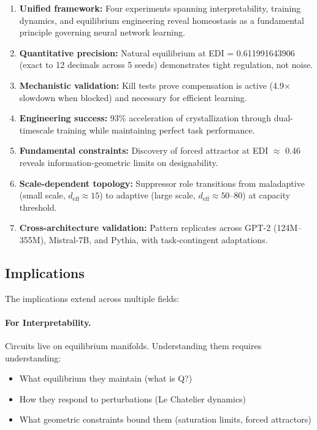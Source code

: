 \begin{enumerate}
\item \textbf{Unified framework:} Four experiments spanning interpretability, training dynamics, and equilibrium engineering reveal homeostasis as a fundamental principle governing neural network learning.

\item \textbf{Quantitative precision:} Natural equilibrium at EDI = 0.611991643906 (exact to 12 decimals across 5 seeds) demonstrates tight regulation, not noise.

\item \textbf{Mechanistic validation:} Kill tests prove compensation is active (4.9× slowdown when blocked) and necessary for efficient learning.

\item \textbf{Engineering success:} 93\% acceleration of crystallization through dual-timescale training while maintaining perfect task performance.

\item \textbf{Fundamental constraints:} Discovery of forced attractor at EDI $\approx$ 0.46 reveals information-geometric limits on designability.

\item \textbf{Scale-dependent topology:} Suppressor role transitions from maladaptive (small scale, $d_{\text{eff}} \approx 15$) to adaptive (large scale, $d_{\text{eff}} \approx 50$--80) at capacity threshold.

\item \textbf{Cross-architecture validation:} Pattern replicates across GPT-2 (124M--355M), Mistral-7B, and Pythia, with task-contingent adaptations.
\end{enumerate}

\subsection{Implications}

The implications extend across multiple fields:

\paragraph{For Interpretability.}
Circuits live on equilibrium manifolds. Understanding them requires understanding:
\begin{itemize}
\item What equilibrium they maintain (what is Q?)
\item How they respond to perturbations (Le Chatelier dynamics)
\item What geometric constraints bound them (saturation limits, forced attractors)
\end{itemize}

